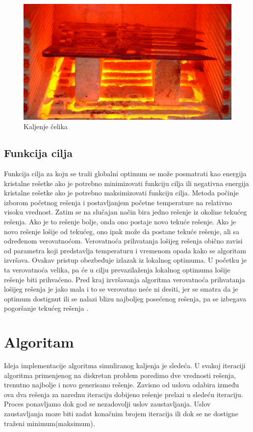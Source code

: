 \documentclass[a4paper]{article}
\begin{document}
\begin{figure}[h!]
\centering
\includegraphics[scale=0.3]{kal.jpg}
\caption{Kaljenje čelika}
\label{fig:universe}
\end{figure}
\subsection{Funkcija cilja}
Funkcija cilja za koju se traži globalni optimum se može posmatrati kao energija kristalne rešetke ako je potrebno minimizovati funkciju cilja ili negativna energija kristalne rešetke ako
je potrebno maksimizovati funkciju cilja. Metoda počinje izborom početnog rešenja i postavljanjem početne temperature na relativno visoku vrednost. Zatim se na slučajan način bira
jedno rešenje iz okoline tekućeg rešenja. Ako je to rešenje bolje, onda ono postaje novo tekuće rešenje. Ako je novo rešenje lošije od tekućeg, ono ipak može da postane tekuće rešenje, ali
sa određenom verovatnoćom. Verovatnoća prihvatanja lošijeg rešenja obično zavisi od parametra koji predstavlja temperaturu i vremenom opada kako se algoritam izvršava. Ovakav pristup obezbeđuje izlazak iz lokalnog optimuma. U početku je ta verovatnoća velika, pa će
u cilju prevazilaženja lokalnog optimuma lošije rešenje biti prihvaćeno. Pred kraj izvršavanja
algoritma verovatnoća prihvatanja lošijeg rešenja je jako mala i to se verovatno neće ni desiti,
jer se smatra da je optimum dostignut ili se nalazi blizu najboljeg posećenog rešenja, pa se
izbegava pogoršanje tekućeg rešenja \cite{gk_master_rad}.


\section{Algoritam}
Ideja implementacije algoritma \cite{sannealingbook} simuliranog kaljenja je sledeća. U svakoj iteraciji algoritma primenjenog na diskretan problem poredimo dve vrednosti rešenja, trenutno najbolje i novo generisano rešenje. Zavisno od uslova odabira između ova dva rešenja za narednu iteraciju dobijeno rešenje prelazi u sledeću iteraciju. Proces ponavljamo  dok god se nezadovolji uslov zaustavljanja. Uslov zaustavljanja moze biti zadat konačnim brojem iteracija ili dok se ne dostigne traženi minimum(maksimum).
\end{document}
